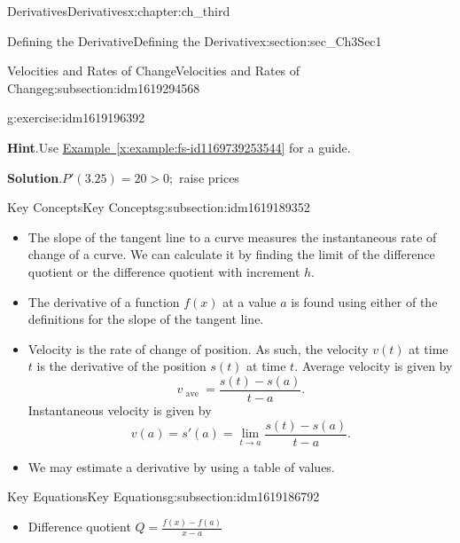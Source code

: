 \documentclass[oneside,10pt,]{book}
\newcommand{\blocktitlefont}{\relax}
\newcommand{\xreffont}{\relax}
\numberwithin{equation}{section}
\newcommand{\gt}{>}
\begin{document}
\begin{chapterptx}{Derivatives}{}{Derivatives}{}{}{x:chapter:ch_third}
\begin{sectionptx}{Defining the Derivative}{}{Defining the Derivative}{}{}{x:section:sec_Ch3Sec1}
\begin{subsectionptx}{Velocities and Rates of Change}{}{Velocities and Rates of Change}{}{}{g:subsection:idm1619294568}
\begin{inlineexercise}{}{g:exercise:idm1619196392}
\par\smallskip%
\noindent\textbf{\blocktitlefont Hint}.\hypertarget{g:hint:idm1619192424}{}\quad{}Use \hyperref[x:example:fs-id1169739253544]{Example~{\xreffont\ref{x:example:fs-id1169739253544}}} for a guide.%
\par\smallskip%
\noindent\textbf{\blocktitlefont Solution}.\hypertarget{g:solution:idm1619191144}{}\quad{}\(P'(3.25)=20\gt 0;\) raise prices%
\end{inlineexercise}%
\end{subsectionptx}
%
%
\typeout{************************************************}
\typeout{************************************************}
%
\begin{subsectionptx}{Key Concepts}{}{Key Concepts}{}{}{g:subsection:idm1619189352}
%
\begin{itemize}[label=\textbullet]
\item{}The slope of the tangent line to a curve measures the instantaneous rate of change of a curve. We can calculate it by finding the limit of the difference quotient or the difference quotient with increment \(h.\)%
\item{}The derivative of a function \(f(x)\) at a value \(a\) is found using either of the definitions for the slope of the tangent line.%
\item{}Velocity is the rate of change of position. As such, the velocity \(v(t)\) at time \(t\) is the derivative of the position \(s(t)\) at time \(t.\) Average velocity is given by%
\begin{equation*}
v_\text{ ave }=\frac{s(t)-s(a)}{t-a}.
\end{equation*}
Instantaneous velocity is given by%
\begin{equation*}
v(a)=s'(a)=\lim_{t\to a}\frac{s(t)-s(a)}{t-a}.
\end{equation*}
%
\item{}We may estimate a derivative by using a table of values.%
\end{itemize}
\end{subsectionptx}
%
%
\typeout{************************************************}
\typeout{************************************************}
%
\begin{subsectionptx}{Key Equations}{}{Key Equations}{}{}{g:subsection:idm1619186792}
%
\begin{itemize}[label=\textbullet]
\item{}Difference quotient \(Q=\frac{f(x)-f(a)}{x-a}\)%

\end{itemize}
\end{subsectionptx}
\end{sectionptx}
\end{chapterptx}
\end{document}
